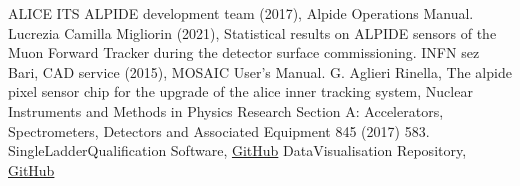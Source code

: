 \documentclass[12pt,oneside,a4]{article}
\begin{document}
\newpage
\begin{thebibliography}{99}
ALICE ITS ALPIDE development team (2017), Alpide Operations Manual.
Lucrezia Camilla Migliorin (2021), Statistical results on ALPIDE sensors of the Muon Forward Tracker during the detector surface commissioning.
INFN sez Bari, CAD service (2015), MOSAIC User's Manual.
G. Aglieri Rinella, The alpide pixel sensor chip for the upgrade of the alice inner tracking system, Nuclear Instruments and Methods in Physics Research Section A: Accelerators, Spectrometers, Detectors and Associated Equipment 845 (2017) 583.
 SingleLadderQualification Software, \href{https://github.com/AudreyFrancisco/SingleLadderQualification}{GitHub}
 DataVisualisation Repository,  \href{https://github.com/fbossu/beam_test_2023/tree/Banco/banco}{GitHub}
\end{thebibliography}
\end{document}
